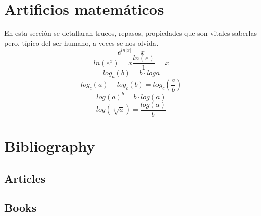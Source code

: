 \documentclass[11pt,fleqn]{book} %
\begin{document}
\chapter{Artificios matemáticos}
En esta sección se detallaran trucos, repasos, propiedades que son vitales saberlas pero, típico del ser humano, a veces se nos olvida.
\begin{equation}\label{art:expaln}
e^{ln|x|}=x
\end{equation}
\begin{equation}\label{art:lnaexp}
ln(e^x)=x\frac{ln(e)}{1}=x
\end{equation}
\begin{equation}\label{art:logaritmos}
log_a(b)=b\cdot log a
\end{equation}
\begin{equation}\label{art:logdiv}
log_c(a)-log_c(b)=log_c\left(\frac{a}{b}\right)
\end{equation}
\begin{equation}\label{art:logexp}
log(a)^b=b\cdot log(a)
\end{equation}
\begin{equation}\label{art:raizlog}
log\left(\sqrt[b]{a}\right)=\frac{log(a)}{b}
\end{equation}


\chapter*{Bibliography}

\section*{Articles}
\printbibliography[heading=bibempty,type=article]


\section*{Books}
\printbibliography[heading=bibempty,type=book]


\cleardoublepage %
\setlength{\columnsep}{0.75cm} %
\printindex %

\end{document}
